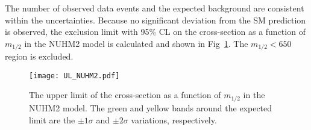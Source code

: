 The number of observed data events and the expected background are consistent within the uncertainties.
Because no significant deviation from the SM prediction is observed, the exclusion limit with 95\% CL on the cross-section as a function of $m_{1/2}$ in the NUHM2 model is calculated and shown in Fig~\ref{tab:app_ss3l_nuhm2_exclusion_plot}.
The $m_{1/2} < 650$~{\GeV} region is excluded.

\begin{figure}[htbp]
    \begin{center}        
        \texttt{[image: UL\_NUHM2.pdf]}
    \end{center}
    \caption{The upper limit of the cross-section as a function of $m_{1/2}$ in the NUHM2 model.
    The green and yellow bands around the expected limit are the $\pm 1 \sigma$ and $\pm 2 \sigma$ variations, respectively.}
    \label{tab:app_ss3l_nuhm2_exclusion_plot}
\end{figure}
